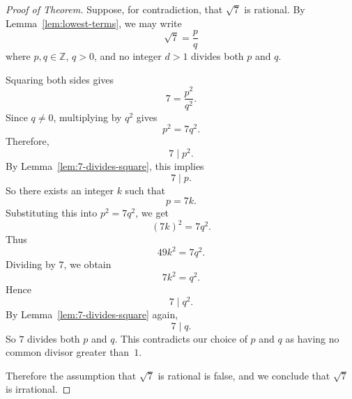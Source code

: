 \begin{proof}[Proof of Theorem]
Suppose, for contradiction, that $\sqrt{7}$ is rational. By Lemma~\ref{lem:lowest-terms}, we may write
\[
\sqrt{7}=\frac{p}{q}
\]
where $p,q\in \mathbb{Z}$, $q>0$, and no integer $d>1$ divides both $p$ and $q$.

Squaring both sides gives
\[
7=\frac{p^2}{q^2}.
\]
Since $q\neq 0$, multiplying by $q^2$ gives
\[
p^2=7q^2.
\]
Therefore,
\[
7\mid p^2.
\]
By Lemma~\ref{lem:7-divides-square}, this implies
\[
7\mid p.
\]
So there exists an integer $k$ such that
\[
p=7k.
\]
Substituting this into $p^2=7q^2$, we get
\[
(7k)^2=7q^2.
\]
Thus
\[
49k^2=7q^2.
\]
Dividing by $7$, we obtain
\[
7k^2=q^2.
\]
Hence
\[
7\mid q^2.
\]
By Lemma~\ref{lem:7-divides-square} again,
\[
7\mid q.
\]
So $7$ divides both $p$ and $q$. This contradicts our choice of $p$ and $q$ as having no common divisor greater than~$1$.

Therefore the assumption that $\sqrt{7}$ is rational is false, and we conclude that $\sqrt{7}$ is irrational.
\end{proof}
